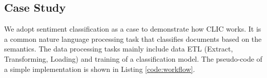 




\subsection{Case Study}
We adopt sentiment classification as a case to demonstrate how CLIC works. It is a common nature language processing task that classifies documents based on the semantics. The data processing tasks mainly include data ETL (Extract, Transforming, Loading) and training of a classification model. The pseudo-code of a simple implementation is shown in Listing \ref{code:workflow}.

